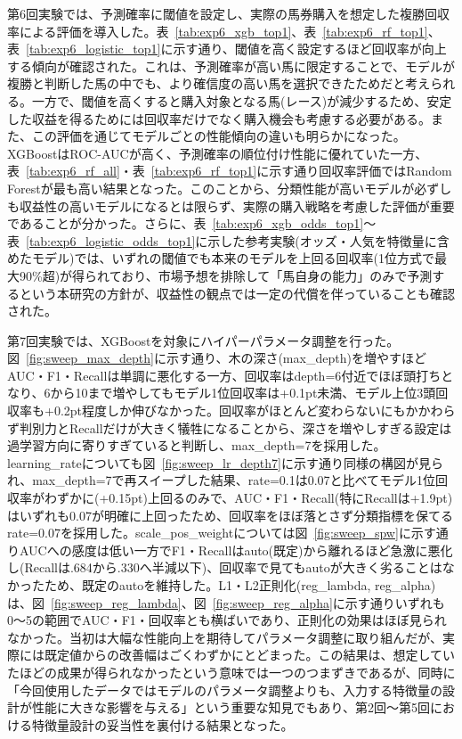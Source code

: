 \documentclass[dvipdfmx, a4paper, 11pt, titlepage]{jsarticle}
\begin{document}
第6回実験では、予測確率に閾値を設定し、実際の馬券購入を想定した複勝回収率による評価を導入した。表~\ref{tab:exp6_xgb_top1}、表~\ref{tab:exp6_rf_top1}、表~\ref{tab:exp6_logistic_top1}に示す通り、閾値を高く設定するほど回収率が向上する傾向が確認された。これは、予測確率が高い馬に限定することで、モデルが複勝と判断した馬の中でも、より確信度の高い馬を選択できたためだと考えられる。一方で、閾値を高くすると購入対象となる馬(レース)が減少するため、安定した収益を得るためには回収率だけでなく購入機会も考慮する必要がある。また、この評価を通じてモデルごとの性能傾向の違いも明らかになった。XGBoostはROC-AUCが高く、予測確率の順位付け性能に優れていた一方、表~\ref{tab:exp6_rf_all}・表~\ref{tab:exp6_rf_top1}に示す通り回収率評価ではRandom Forestが最も高い結果となった。このことから、分類性能が高いモデルが必ずしも収益性の高いモデルになるとは限らず、実際の購入戦略を考慮した評価が重要であることが分かった。さらに、表~\ref{tab:exp6_xgb_odds_top1}〜表~\ref{tab:exp6_logistic_odds_top1}に示した参考実験(オッズ・人気を特徴量に含めたモデル)では、いずれの閾値でも本来のモデルを上回る回収率(1位方式で最大90\%超)が得られており、市場予想を排除して「馬自身の能力」のみで予測するという本研究の方針が、収益性の観点では一定の代償を伴っていることも確認された。

第7回実験では、XGBoostを対象にハイパーパラメータ調整を行った。図~\ref{fig:sweep_max_depth}に示す通り、木の深さ(max\_depth)を増やすほどAUC・F1・Recallは単調に悪化する一方、回収率はdepth=6付近でほぼ頭打ちとなり、6から10まで増やしてもモデル1位回収率は+0.1pt未満、モデル上位3頭回収率も+0.2pt程度しか伸びなかった。回収率がほとんど変わらないにもかかわらず判別力とRecallだけが大きく犠牲になることから、深さを増やしすぎる設定は過学習方向に寄りすぎていると判断し、max\_depth=7を採用した。learning\_rateについても図~\ref{fig:sweep_lr_depth7}に示す通り同様の構図が見られ、max\_depth=7で再スイープした結果、rate=0.1は0.07と比べてモデル1位回収率がわずかに(+0.15pt)上回るのみで、AUC・F1・Recall(特にRecallは+1.9pt)はいずれも0.07が明確に上回ったため、回収率をほぼ落とさず分類指標を保てるrate=0.07を採用した。scale\_pos\_weightについては図~\ref{fig:sweep_spw}に示す通りAUCへの感度は低い一方でF1・Recallはauto(既定)から離れるほど急激に悪化し(Recallは.684から.330へ半減以下)、回収率で見てもautoが大きく劣ることはなかったため、既定のautoを維持した。L1・L2正則化(reg\_lambda, reg\_alpha)は、図~\ref{fig:sweep_reg_lambda}、図~\ref{fig:sweep_reg_alpha}に示す通りいずれも0〜5の範囲でAUC・F1・回収率とも横ばいであり、正則化の効果はほぼ見られなかった。当初は大幅な性能向上を期待してパラメータ調整に取り組んだが、実際には既定値からの改善幅はごくわずかにとどまった。この結果は、想定していたほどの成果が得られなかったという意味では一つのつまずきであるが、同時に「今回使用したデータではモデルのパラメータ調整よりも、入力する特徴量の設計が性能に大きな影響を与える」という重要な知見でもあり、第2回〜第5回における特徴量設計の妥当性を裏付ける結果となった。
\end{document}

